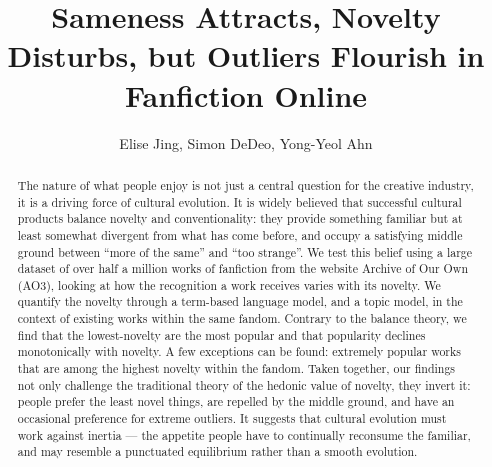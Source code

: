 \documentclass[letterpaper]{article} %
\begin{document}
\title{Sameness Attracts, Novelty Disturbs, but Outliers Flourish in Fanfiction Online}
\author{Elise Jing, Simon DeDeo, Yong-Yeol Ahn}

\maketitle
\begin{abstract}
The nature of what people enjoy is not just a central question for the creative industry, it is a driving force of cultural evolution. It is widely believed that successful cultural products balance novelty and conventionality: they provide something familiar but at least somewhat divergent from what has come before, and occupy a satisfying middle ground between ``more of the same'' and ``too strange''. We test this belief using a large dataset of over half a million works of fanfiction from the website Archive of Our Own (AO3), looking at how the recognition a work receives varies with its novelty. We quantify the novelty through a term-based language model, and a topic model, in the context of existing works within the same fandom. Contrary to the balance theory, we find that the lowest-novelty are the most popular and that popularity declines monotonically with novelty. A few exceptions can be found: extremely popular works that are among the  highest novelty within the fandom. Taken together, our findings not only challenge the traditional theory of the hedonic value of novelty, they invert it: people prefer the least novel things, are repelled by the middle ground, and have an occasional preference for extreme outliers. It suggests that cultural evolution must work against inertia --- the appetite people have to continually reconsume the familiar, and may resemble a punctuated equilibrium rather than a smooth evolution.
\end{abstract}
\end{document}
